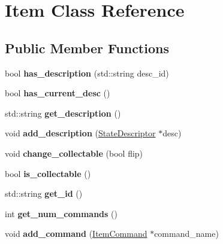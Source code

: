\hypertarget{class_item}{
\section{Item Class Reference}
\label{class_item}
}
\subsection*{Public Member Functions}
\begin{DoxyCompactItemize}
\item 
\hypertarget{class_item_a75f9cdba85ba1ce65b4ff71073ba8387}{
bool {\bfseries has\_\-description} (std::string desc\_\-id)}
\label{class_item_a75f9cdba85ba1ce65b4ff71073ba8387}

\item 
\hypertarget{class_item_a703702e1992a45ac32beb2eb0e3e38bf}{
bool {\bfseries has\_\-current\_\-desc} ()}
\label{class_item_a703702e1992a45ac32beb2eb0e3e38bf}

\item 
\hypertarget{class_item_a8652cab970af5b7ff68bf960a4e98fa2}{
std::string {\bfseries get\_\-description} ()}
\label{class_item_a8652cab970af5b7ff68bf960a4e98fa2}

\item 
\hypertarget{class_item_af6e0efea4346f669ac5479b258511e68}{
void {\bfseries add\_\-description} (\hyperlink{class_state_descriptor}{StateDescriptor} $\ast$desc)}
\label{class_item_af6e0efea4346f669ac5479b258511e68}

\item 
\hypertarget{class_item_ab8c43c172fbff161c8c2ca765ded9537}{
void {\bfseries change\_\-collectable} (bool flip)}
\label{class_item_ab8c43c172fbff161c8c2ca765ded9537}

\item 
\hypertarget{class_item_a91f14a96cab681bc02dee3f9c9e6af5d}{
bool {\bfseries is\_\-collectable} ()}
\label{class_item_a91f14a96cab681bc02dee3f9c9e6af5d}

\item 
\hypertarget{class_item_a7a3aedd7ab7f81327f57343dcb55d42d}{
std::string {\bfseries get\_\-id} ()}
\label{class_item_a7a3aedd7ab7f81327f57343dcb55d42d}

\item 
\hypertarget{class_item_a9f09c704274546d5bd0903d0cddfd194}{
int {\bfseries get\_\-num\_\-commands} ()}
\label{class_item_a9f09c704274546d5bd0903d0cddfd194}

\item 
\hypertarget{class_item_ab78d891c3aed983ea7b2e5311b0da68c}{
void {\bfseries add\_\-command} (\hyperlink{class_item_command}{ItemCommand} $\ast$command\_\-name)}
\label{class_item_ab78d891c3aed983ea7b2e5311b0da68c}


\end{DoxyCompactItemize}
